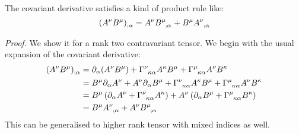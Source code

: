 \begin{theorem}
    The covariant derivative satisfies a kind of product rule like: 
    \[
\tensor{(A^\nu B^\mu)}{_{;\alpha}} = \tensor{A}{^\nu} \tensor{B}{^\mu _{;\alpha}} + \tensor{B}{^\mu} \tensor{A}{^\nu _{;\alpha}}
\]

\end{theorem}
\textit{Proof.} We show it for a rank two contravariant tensor. We begin with the usual expansion of the covariant derivative:
\begin{align*}
    \tensor{(A^\nu B^\mu)}{_{;\alpha}} &=   \partial_\alpha(A^\nu B^\mu) + \tensor{\Gamma}{^\nu _{\kappa \alpha}}A^\kappa B^\mu +\tensor{\Gamma}{^\mu _{\kappa \alpha}}A^\nu B^\kappa  \\
    &= B^\mu \partial_\alpha A^\nu +  A^\nu \partial_\alpha B^\mu  + \tensor{\Gamma}{^\nu _{\kappa \alpha}}A^\kappa B^\mu +\tensor{\Gamma}{^\mu _{\kappa \alpha}}A^\nu B^\kappa\\
    &=B^\mu\brac{\partial_\alpha A^\nu  + \tensor{\Gamma}{^\nu _{\kappa \alpha}}A^\kappa} + A^\nu \brac{\partial_\alpha B^\mu +\tensor{\Gamma}{^\mu _{\kappa \alpha}} B^\kappa}\\
    &= \tensor{B}{^\mu} \tensor{A}{^\nu _{;\alpha}} + \tensor{A}{^\nu} \tensor{B}{^\mu _{;\alpha}}
\end{align*}
This can be generalised to higher rank tensor with mixed indices as well. 

